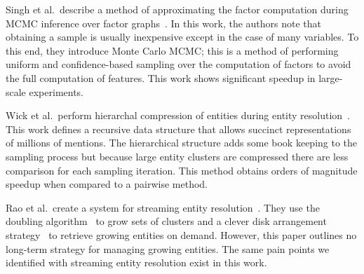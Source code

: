Singh et al.\ describe a method of approximating the factor computation during MCMC
inference over factor graphs~\cite{singh2011large}.
In this work, the authors note that obtaining a sample is usually inexpensive
except in the case of many variables. To this end, they introduce Monte Carlo
MCMC; this is a method of performing uniform and confidence-based sampling
over the computation of factors to avoid the full computation of features.
This work shows significant speedup in large-scale experiments.


Wick et al.\ perform hierarchal compression of entities during
entity resolution~\cite{wick2013discriminative}.
This work defines a recursive data structure that allows succinct representations
of millions of mentions. 
The hierarchical structure adds some book keeping to the sampling process but because
large entity clusters are compressed there are less comparison for each sampling iteration. 
This method obtains orders of magnitude speedup
when compared to a pairwise method.

Rao et al.\ create a system for streaming entity resolution~\cite{rao2010streaming}.
They use the doubling algorithm~\cite{charikar1997incremental} to grow sets of clusters
and a clever disk arrangement strategy~\cite{omiecinski1984global} to retrieve
growing entities on demand.
However, this paper outlines no long-term strategy for managing growing entities.
The same pain points we identified with streaming entity resolution exist in this work.



